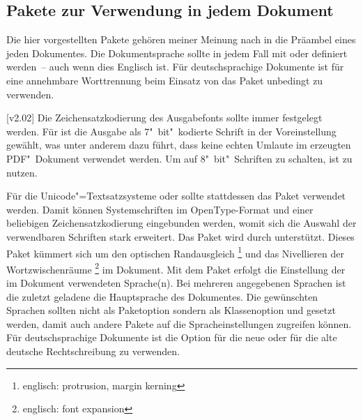 \subsection{Pakete zur Verwendung in jedem Dokument}

Die hier vorgestellten Pakete gehören meiner Meinung nach in die Präambel eines 
jeden Dokumentes. Die Dokumentsprache sollte in jedem Fall mit  
oder  definiert werden~-- auch wenn dies Englisch ist. Für 
deutschsprachige Dokumente ist für eine annehmbare Worttrennung beim Einsatz 
von  das Paket  unbedingt zu verwenden.

\begin{DeclarePackages}
[v2.02]
  Die Zeichensatzkodierung des Ausgabefonts sollte immer festgelegt werden. Für 
   ist die Ausgabe als 7"~bit"~kodierte Schrift in der 
  Voreinstellung gewählt, was unter anderem dazu führt, dass keine echten
  Umlaute im erzeugten PDF"~Dokument verwendet werden. Um auf 8"~bit"~Schriften
  zu schalten, ist  zu
  nutzen.
  
  Für die Unicode"=Textsatzsysteme  oder  
  sollte stattdessen das Paket  verwendet werden. Damit 
  können Systemschriften im OpenType-Format und einer beliebigen 
  Zeichensatzkodierung eingebunden werden, womit sich die Auswahl der 
  verwendbaren Schriften stark erweitert. Das Paket wird durch \TUDScript 
  unterstützt.
  Dieses Paket kümmert sich um den optischen Randausgleich%
  \footnote{englisch: protrusion, margin kerning}
  und das Nivellieren der Wortzwischenräume%
  \footnote{englisch: font expansion}
  im Dokument.
  Mit dem Paket  erfolgt die Einstellung der im Dokument 
  verwendeten Sprache(n). Bei mehreren angegebenen Sprachen ist die zuletzt 
  geladene die Hauptsprache des Dokumentes. Die gewünschten Sprachen sollten 
  nicht als Paketoption sondern als Klassenoption und gesetzt werden, damit 
  auch andere Pakete auf die Spracheinstellungen zugreifen können. Für 
  deutschsprachige Dokumente ist die Option  für die neue oder 
   für die alte deutsche Rechtschreibung zu verwenden. 
  

\end{DeclarePackages}
